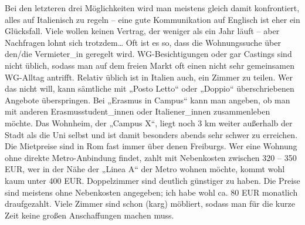 \documentclass[a4paper,12pt]{article}
\begin{document}
Bei den letzteren drei Möglichkeiten wird man meistens gleich damit konfrontiert, alles auf Italienisch zu regeln – eine gute Kommunikation auf Englisch ist eher ein Glücksfall. Viele wollen keinen Vertrag, der weniger als ein Jahr läuft – aber Nachfragen lohnt sich trotzdem… Oft ist es so, dass die Wohnungssuche über den/die Vermieter\_in geregelt wird. WG-Besichtigungen oder gar Castings sind nicht üblich, sodass man auf dem freien Markt oft einen nicht sehr gemeinsamen WG-Alltag antrifft. Relativ üblich ist in Italien auch, ein Zimmer zu teilen. Wer das nicht will, kann sämtliche mit „Posto Letto“ oder „Doppio“ überschriebenen Angebote überspringen. Bei „Erasmus in Campus“ kann man angeben, ob man mit anderen Erasmusstudent\_innen oder Italiener\_innen zusammenleben möchte. Das Wohnheim, der „Campus X“, liegt noch 3 km weiter außerhalb der Stadt als die Uni selbst und ist damit besonders abends sehr schwer zu erreichen. \\
Die Mietpreise sind in Rom fast immer über denen Freiburgs. Wer eine Wohnung ohne direkte Metro-Anbindung findet, zahlt mit Nebenkosten zwischen 320 – 350 EUR, wer in der Nähe der „Linea A“ der Metro wohnen möchte, kommt wohl kaum unter 400 EUR. Doppelzimmer sind deutlich günstiger zu haben. Die Preise sind meistens ohne Nebenkosten angegeben; ich habe wohl ca. 80 EUR monatlich draufgezahlt. Viele Zimmer sind schon (karg) möbliert, sodass man für die kurze Zeit keine großen Anschaffungen machen muss. 
\end{document}
